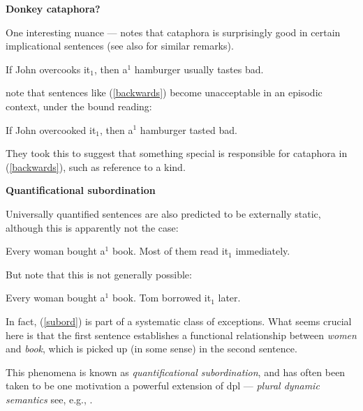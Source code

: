 \documentclass[nols,twoside,nofonts,nobib,nohyper]{tufte-handout}
\theoremstyle{observation}
\theoremstyle{theorem}
\theoremstyle{corollary}
\theoremstyle{definition}
\begin{document}
  \textbf{Donkey cataphora?}

  One interesting nuance --- \cite[p. 192]{Chierchia1995} notes that cataphora is surprisingly good in certain implicational sentences (see also \citealt{BarkerShan2008} for similar remarks).

  \ex
  If John overcooks it$_{1}$, then a$^{1}$ hamburger usually tastes bad.\label{backwards}
  \xe

  \citet{ElliottSudo2019} note that sentences like (\ref{backwards}) become unacceptable in an episodic context, under the bound reading:

  \ex
  \ljudge{\#}If John overcooked it$_{1}$, then a$^{1}$ hamburger tasted bad.
  \xe

  They took this to suggest that something special is responsible for cataphora in (\ref{backwards}), such as reference to a kind.

  \textbf{Quantificational subordination}

  Universally quantified sentences are also predicted to be externally static, although this is apparently not the case:

  \ex
  Every woman bought a$^{1}$ book. Most of them read it$_{1}$ immediately.\label{subord}
  \xe

  But note that this is not generally possible:

  \ex
  \ljudge{\#}Every woman bought a$^{1}$ book. Tom borrowed it$_{1}$ later.
  \xe

  In fact, (\ref{subord}) is part of a systematic class of exceptions. What seems crucial here is that the first sentence establishes a functional relationship between \textit{women} and \textit{book}, which is picked up (in some sense) in the second sentence.

  This phenomena is known as \textit{quantificational subordination}, and has often been taken to be one motivation a powerful extension of \ac{dpl} --- \textit{plural dynamic semantics} see, e.g., \citealt{vandenBerg1996,Brasoveanu2007}.
\end{document}
